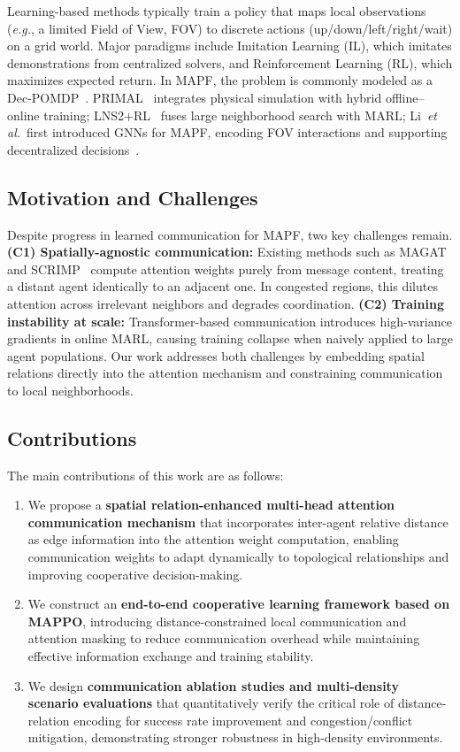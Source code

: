 \documentclass[sigconf]{acmart}
\newcommand{\eg}{\textit{e.g.}}
\newcommand{\etal}{\textit{et al.}}
\begin{document}
Learning-based methods typically train a policy that maps local
observations (\eg, a limited Field of View, FOV) to discrete
actions (up/down/left/right/wait) on a grid world.
Major paradigms include Imitation Learning (IL), which imitates
demonstrations from centralized solvers, and Reinforcement
Learning (RL), which maximizes expected return.
In MAPF, the problem is commonly modeled as a
Dec-POMDP~\cite{huang2021strategic}.
PRIMAL~\cite{sartoretti2019primal} integrates physical simulation
with hybrid offline--online training;
LNS2+RL~\cite{wang2025lns2rl} fuses large neighborhood search
with MARL;
Li~\etal~first introduced GNNs for MAPF, encoding FOV
interactions and supporting decentralized
decisions~\cite{li2020gnn,li2021magat}.

\subsection{Motivation and Challenges}

Despite progress in learned communication for MAPF, two key
challenges remain.
\textbf{(C1) Spatially-agnostic communication:}
Existing methods such as MAGAT~\cite{li2021magat} and
SCRIMP~\cite{wang2023scrimp} compute attention weights purely from
message content, treating a distant agent identically to an
adjacent one. In congested regions, this dilutes attention across
irrelevant neighbors and degrades coordination.
\textbf{(C2) Training instability at scale:}
Transformer-based communication introduces high-variance gradients
in online MARL, causing training collapse when naively applied to
large agent populations.
Our work addresses both challenges by embedding spatial relations
directly into the attention mechanism and constraining
communication to local neighborhoods.

\subsection{Contributions}

The main contributions of this work are as follows:
\begin{enumerate}
\item We propose a \textbf{spatial relation-enhanced multi-head
      attention communication mechanism} that incorporates
      inter-agent relative distance as edge information into the
      attention weight computation, enabling communication weights
      to adapt dynamically to topological relationships and
      improving cooperative decision-making.
\item We construct an \textbf{end-to-end cooperative learning
      framework based on MAPPO}, introducing distance-constrained
      local communication and attention masking to reduce
      communication overhead while maintaining effective
      information exchange and training stability.
\item We design \textbf{communication ablation studies and
      multi-density scenario evaluations} that quantitatively
      verify the critical role of distance-relation encoding for
      success rate improvement and congestion/conflict mitigation,
      demonstrating stronger robustness in high-density
      environments.
\end{enumerate}
\end{document}
